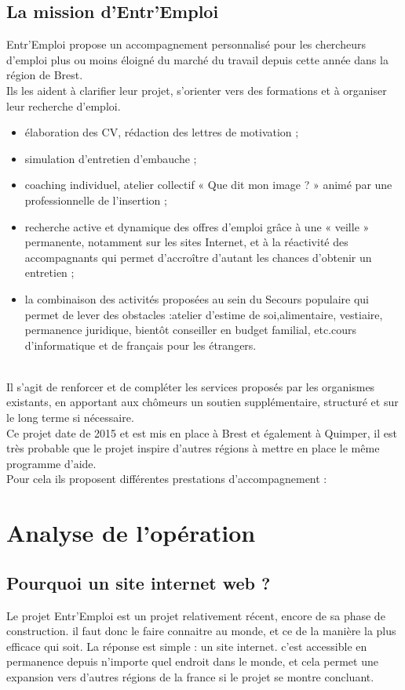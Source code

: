 \documentclass[a4paper, 12pt]{report}
\begin{document}
\section{La mission d'Entr'Emploi}
Entr'Emploi propose un accompagnement personnalisé pour les chercheurs d'emploi plus ou moins éloigné du marché du travail depuis cette année dans la région de Brest.\\
Ils les aident à clarifier leur projet, s'orienter vers des formations et à organiser leur recherche d'emploi.\\
\begin{itemize}
\item élaboration des CV, rédaction des lettres de motivation ;
\item simulation d’entretien d’embauche ;
\item coaching individuel, atelier collectif « Que dit mon image ? » animé par une professionnelle de l’insertion ;
\item recherche active et dynamique des offres d’emploi grâce à une « veille » permanente, notamment sur les sites Internet, et à la réactivité des accompagnants qui permet d’accroître d’autant les chances d’obtenir un entretien ;
\item la combinaison des activités proposées au sein du Secours populaire qui permet de lever des obstacles :atelier d’estime de soi,alimentaire, vestiaire, permanence juridique, bientôt conseiller en budget familial, etc.cours d’informatique et de français pour les étrangers.
\end{itemize}
\ \\
Il s'agit de renforcer et de compléter les services proposés par les organismes existants, en apportant aux chômeurs un soutien supplémentaire, structuré et sur le long terme si nécessaire.\\
Ce projet date de 2015 et est mis en place à Brest et également à Quimper, il est très probable que le projet inspire d'autres régions à mettre en place le même programme d'aide.\\
Pour cela ils proposent différentes prestations d’accompagnement :


\chapter{Analyse de l’opération}
\thispagestyle{fancy}
\section{Pourquoi un site internet web ?}
Le projet Entr'Emploi est un projet relativement récent, encore de sa phase de construction. il faut donc le faire
connaitre au monde, et ce de la manière la plus efficace qui soit. La réponse est simple : un site internet.
c'est accessible en permanence depuis n'importe quel endroit dans le monde, et cela permet une expansion vers d'autres
régions de la france si le projet se montre concluant.
\end{document}
